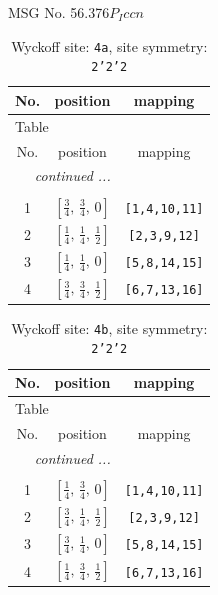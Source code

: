 \documentclass[fleqn,8pt]{jsarticle}
\begin{document}
\setcounter{MaxMatrixCols}{32}

\renewcommand{\tablename}{Table~}
\renewcommand{\figurename}{Figure~}
\begin{center}
\LARGE
MSG No. 56.376\quad$P_{I}ccn$
\end{center}
\renewcommand{\arraystretch}{1.2}
\begin{longtable}{ccc}
\caption{Wyckoff site: {\tt 4a}, site symmetry: {\tt 2'2'2}}
 \\
 \hline \hline
No. & position & mapping \\ \hline \endfirsthead

\multicolumn{2}{l}{\tablename\ \thetable{}} \\
 \hline \hline
No. & position & mapping \\ \hline \endhead

 \hline \hline
\multicolumn{2}{r}{\footnotesize\it continued ...} \\ \endfoot

 \hline \hline
\multicolumn{2}{r}{} \\ \endlastfoot

1 & $\left[ \frac{3}{4},\, \frac{3}{4},\, 0 \right]$ & {\tt [1,4,10,11]} \\ \hline
2 & $\left[ \frac{1}{4},\, \frac{1}{4},\, \frac{1}{2} \right]$ & {\tt [2,3,9,12]} \\ \hline
3 & $\left[ \frac{1}{4},\, \frac{1}{4},\, 0 \right]$ & {\tt [5,8,14,15]} \\ \hline
4 & $\left[ \frac{3}{4},\, \frac{3}{4},\, \frac{1}{2} \right]$ & {\tt [6,7,13,16]} \\
\end{longtable}
\renewcommand{\arraystretch}{1.2}
\begin{longtable}{ccc}
\caption{Wyckoff site: {\tt 4b}, site symmetry: {\tt 2'2'2}}
 \\
 \hline \hline
No. & position & mapping \\ \hline \endfirsthead

\multicolumn{2}{l}{\tablename\ \thetable{}} \\
 \hline \hline
No. & position & mapping \\ \hline \endhead

 \hline \hline
\multicolumn{2}{r}{\footnotesize\it continued ...} \\ \endfoot

 \hline \hline
\multicolumn{2}{r}{} \\ \endlastfoot

1 & $\left[ \frac{1}{4},\, \frac{3}{4},\, 0 \right]$ & {\tt [1,4,10,11]} \\ \hline
2 & $\left[ \frac{3}{4},\, \frac{1}{4},\, \frac{1}{2} \right]$ & {\tt [2,3,9,12]} \\ \hline
3 & $\left[ \frac{3}{4},\, \frac{1}{4},\, 0 \right]$ & {\tt [5,8,14,15]} \\ \hline
4 & $\left[ \frac{1}{4},\, \frac{3}{4},\, \frac{1}{2} \right]$ & {\tt [6,7,13,16]} \\
\end{longtable}
\end{document}

